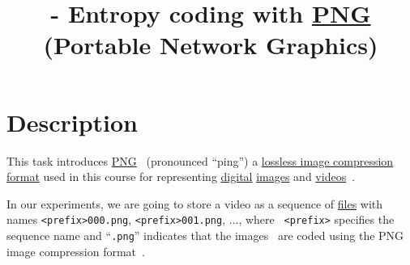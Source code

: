 


\title{\SM{} - Entropy coding with
  \href{https://vicente-gonzalez-ruiz.github.io/PNG/}{PNG} (Portable
  Network Graphics)}

\maketitle

\tableofcontents

\section{Description}

This task introduces
\href{https://en.wikipedia.org/wiki/Portable_Network_Graphics}{PNG}~\cite{vruiz__PNG}
(pronounced ``ping'') a
\href{https://en.wikipedia.org/wiki/Lossless_compression}{lossless
  image compression format} used in this course for representing
\href{https://en.wikipedia.org/wiki/Digital_data}{digital}
\href{https://en.wikipedia.org/wiki/Digital_image}{images} and
\href{https://en.wikipedia.org/wiki/Video}{videos}~\cite{vruiz__image_video}.

In our experiments, we are going to store a video as a sequence of
\href{https://en.wikipedia.org/wiki/Computer_file}{files} with names
     {\tt <prefix>000.png}, {\tt <prefix>001.png}, ..., where {\tt
       <prefix>} specifies the sequence name and ``{\tt .png}''
     indicates that the images~\cite{vruiz__image_IO} are coded using
     the PNG image compression
     format~\cite{roelofs1999png,world2003portable}.


  

